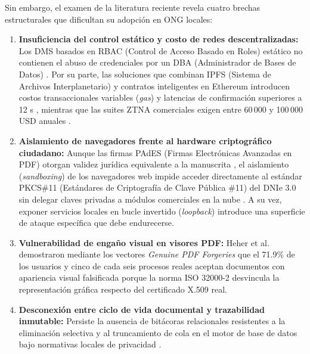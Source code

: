 \documentclass[runningheads,twocolumn]{llncs}
\begin{document}
Sin embargo, el examen de la literatura reciente revela cuatro brechas estructurales que dificultan su adopción en ONG locales:
\begin{enumerate}
    \item \textbf{Insuficiencia del control estático y costo de redes descentralizadas:} Los DMS basados en RBAC (Control de Acceso Basado en Roles) estático no contienen el abuso de credenciales por un DBA (Administrador de Bases de Datos) \cite{han2025,soni2026}. Por su parte, las soluciones que combinan IPFS (Sistema de Archivos Interplanetario) y contratos inteligentes en Ethereum introducen costos transaccionales variables (\textit{gas}) y latencias de confirmación superiores a 12 s \cite{han2025,swapna2026}, mientras que las suites ZTNA comerciales exigen entre 60\,000 y 100\,000 USD anuales \cite{swapna2026}.
    \item \textbf{Aislamiento de navegadores frente al hardware criptográfico ciudadano:} Aunque las firmas PAdES (Firmas Electrónicas Avanzadas en PDF) otorgan validez jurídica equivalente a la manuscrita \cite{doynov2026,etsi2024,ley27269}, el aislamiento (\textit{sandboxing}) de los navegadores web impide acceder directamente al estándar PKCS\#11 (Estándares de Criptografía de Clave Pública \#11) del DNIe 3.0 sin delegar claves privadas a módulos comerciales en la nube \cite{liu2026,reniec2025}. A su vez, exponer servicios locales en bucle invertido (\textit{loopback}) introduce una superficie de ataque específica que debe endurecerse.
    \item \textbf{Vulnerabilidad de engaño visual en visores PDF:} Heher et al. \cite{heher2027} demostraron mediante los vectores \textit{Genuine PDF Forgeries} que el 71.9\% de los usuarios y cinco de cada seis procesos reales aceptan documentos con apariencia visual falsificada porque la norma ISO 32000-2 desvincula la representación gráfica respecto del certificado X.509 real.
    \item \textbf{Desconexión entre ciclo de vida documental y trazabilidad inmutable:} Persiste la ausencia de bitácoras relacionales resistentes a la eliminación selectiva y al truncamiento de cola en el motor de base de datos bajo normativas locales de privacidad \cite{alenezi2026,saricicek2026}.
\end{enumerate}
\end{document}
